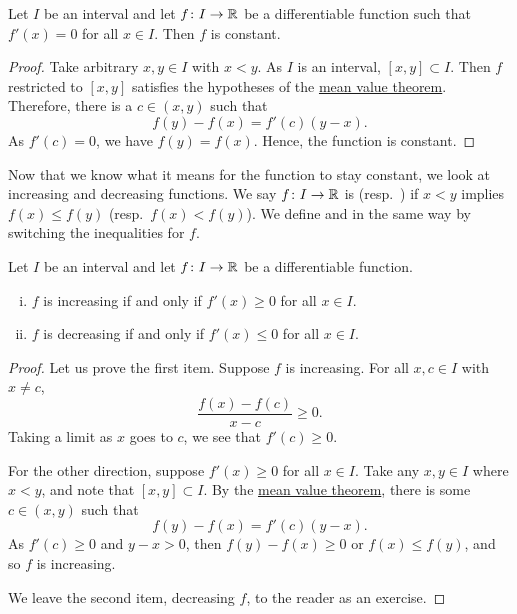 \begin{prop} \label{prop:derzeroconst}
Let $I$ be an interval and
let $f \colon I \to {\mathbb{R}}$ be a differentiable function such that $f'(x) = 0$
for all $x \in I$.
Then $f$ is constant.
\end{prop}

\begin{proof}
Take arbitrary $x,y \in I$ with $x < y$.
As $I$ is an interval, $[x,y] \subset I$.
Then $f$ restricted to $[x,y]$ satisfies the hypotheses
of the \hyperref[thm:mvt]{mean value theorem}.
Therefore, there is a $c \in (x,y)$ such that
\begin{equation*}
f(y)-f(x) = f'(c)(y-x).
\end{equation*}
As $f'(c) = 0$, we have $f(y) = f(x)$.  Hence,
the function is constant.
\end{proof}

Now that we know what it means for the function to stay constant, we look
at increasing and decreasing functions.
We say $f \colon I \to {\mathbb{R}}$ is \emph{}
(resp.\  \emph{}) if
$x < y$ implies $f(x) \leq f(y)$ (resp.\ $f(x) < f(y)$).
We define
\emph{} and
\emph{} in the same way by switching the
inequalities for $f$.

\begin{prop} \label{incdecdiffprop}
Let $I$ be an interval and
let $f \colon I \to {\mathbb{R}}$ be a differentiable function.
\begin{enumerate}[(i)]
\item $f$ is increasing if and only if $f'(x) \geq 0$ for all $x \in I$.
\item $f$ is decreasing if and only if $f'(x) \leq 0$ for all $x \in I$.
\end{enumerate}
\end{prop}

\begin{proof}
Let us prove the first item.  Suppose $f$ is increasing.
For all $x,c \in I$ with $x \neq c$,
\begin{equation*}
\frac{f(x)-f(c)}{x-c} \geq 0 .
\end{equation*}
Taking a limit as $x$ goes to $c$, we see that $f'(c) \geq 0$.

For the other direction, suppose $f'(x) \geq 0$ for all $x \in I$.
Take any $x, y \in I$ where $x < y$, and note that $[x,y] \subset I$.
By the \hyperref[thm:mvt]{mean value theorem}, there is some $c \in (x,y)$ such that
\begin{equation*}
f(y)-f(x) = f'(c)(y-x) .
\end{equation*}
As $f'(c) \geq 0$ and $y-x > 0$, then $f(y) - f(x) \geq 0$ or $f(x) \leq
f(y)$, and so
$f$ is increasing.

We leave the second item, decreasing $f$, to the reader as an exercise.
\end{proof}

